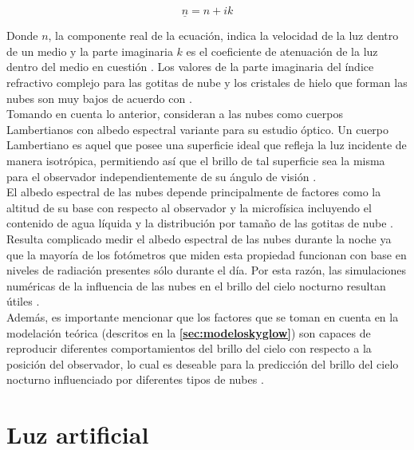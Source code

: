 \begin{equation}
\underline{n} = n + i k
\end{equation}

\vspace{2mm} 

Donde $n$, la componente real de la ecuación, indica la velocidad de la luz dentro de un medio y la parte imaginaria $k$ es el coeficiente de atenuación de la luz dentro del medio en cuestión \citep{Born&Wolf2003}. Los valores de la parte imaginaria del índice refractivo complejo para las gotitas de nube y los cristales de hielo que forman las nubes son muy bajos de acuerdo con \cite{Solano2015}.\\

Tomando en cuenta lo anterior, \cite{Solano2015} consideran a las nubes como cuerpos Lambertianos con albedo espectral variante para su estudio óptico. Un cuerpo Lambertiano es aquel que posee una superficie ideal que refleja la luz incidente de manera isotrópica, permitiendo así que el brillo de tal superficie sea la misma para el observador independientemente de su ángulo de visión \citep{Born&Wolf2003}.\\

El albedo espectral de las nubes depende principalmente de factores como la altitud de su base con respecto al observador y la microfísica incluyendo el contenido de agua líquida y la distribución por tamaño de las gotitas de nube \citep{Kocifaj2007}.\\ 

Resulta complicado medir el albedo espectral de las nubes durante la noche ya que la mayoría de los fotómetros que miden esta propiedad funcionan con base en niveles de radiación presentes sólo durante el día. Por esta razón, las simulaciones numéricas de la influencia de las nubes en el brillo del cielo nocturno resultan útiles \citep{Solano2015}.\\

Además, es importante mencionar que los factores que se toman en cuenta en la modelación teórica (descritos en la \textbf{\autoref{sec:modeloskyglow}}) son capaces de reproducir diferentes comportamientos del brillo del cielo con respecto a la posición del observador, lo cual es deseable para la predicción del brillo del cielo nocturno influenciado por diferentes tipos de nubes \citep{Kocifaj2007,Solano2015}.

\newpage

\section{Luz artificial}\\
\label{sec:luzartificial}

